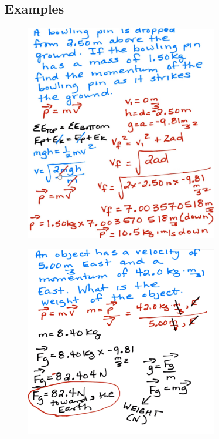 \documentclass[a4paper,12pt]{article}
\begin{document}
\subsection{Examples}
\begin{figure}[H]
    \centering
    \includegraphics[width=0.75\textwidth]{q-mom}
\end{figure}
\begin{figure}[H]
    \centering
    \includegraphics[width=0.75\textwidth]{q-mom-2}
\end{figure}
\end{document}
